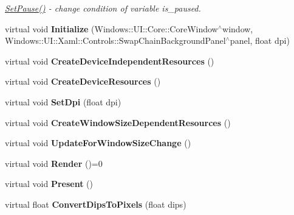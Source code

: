 \begin{DoxyCompactItemize}
\begin{DoxyCompactList}\small\item\em \hyperlink{classabstract_a4fddd7589c3969ecd3f2d6b13454237f}{Set\+Pause()} -\/ change condition of variable is\+\_\+paused. \end{DoxyCompactList}\item 
\hypertarget{classabstract_a7493affccf805f00fd570b71e21f7f28}{}virtual void {\bfseries Initialize} (Windows\+::\+U\+I\+::\+Core\+::\+Core\+Window$^\wedge$window, Windows\+::\+U\+I\+::\+Xaml\+::\+Controls\+::\+Swap\+Chain\+Background\+Panel$^\wedge$panel, float dpi)\label{classabstract_a7493affccf805f00fd570b71e21f7f28}

\item 
\hypertarget{classabstract_ae5d9c0f184dd5b93fa25c592b1216a48}{}virtual void {\bfseries Create\+Device\+Independent\+Resources} ()\label{classabstract_ae5d9c0f184dd5b93fa25c592b1216a48}

\item 
\hypertarget{classabstract_a7552b9f91e3323806eaa5ee1ff98272b}{}virtual void {\bfseries Create\+Device\+Resources} ()\label{classabstract_a7552b9f91e3323806eaa5ee1ff98272b}

\item 
\hypertarget{classabstract_a919866f3e1802ac79792f1298c5ece87}{}virtual void {\bfseries Set\+Dpi} (float dpi)\label{classabstract_a919866f3e1802ac79792f1298c5ece87}

\item 
\hypertarget{classabstract_acfccc8b9e516e87c3e04cf09221e0992}{}virtual void {\bfseries Create\+Window\+Size\+Dependent\+Resources} ()\label{classabstract_acfccc8b9e516e87c3e04cf09221e0992}

\item 
\hypertarget{classabstract_a3804ec15b30b817f87d5d3a8e85675c9}{}virtual void {\bfseries Update\+For\+Window\+Size\+Change} ()\label{classabstract_a3804ec15b30b817f87d5d3a8e85675c9}

\item 
\hypertarget{classabstract_ac1ca23d738617f830fc0914e0ed1fb0d}{}virtual void {\bfseries Render} ()=0\label{classabstract_ac1ca23d738617f830fc0914e0ed1fb0d}

\item 
\hypertarget{classabstract_a05542813f28858202c441b8a6cfe3f72}{}virtual void {\bfseries Present} ()\label{classabstract_a05542813f28858202c441b8a6cfe3f72}

\item 
\hypertarget{classabstract_a08561ac9785cb94afcb6b46c418166f8}{}virtual float {\bfseries Convert\+Dips\+To\+Pixels} (float dips)\label{classabstract_a08561ac9785cb94afcb6b46c418166f8}

\end{DoxyCompactItemize}
